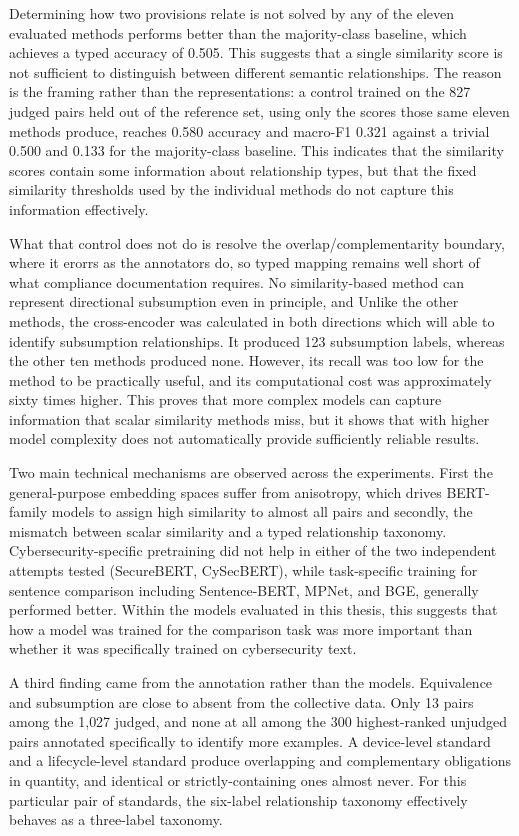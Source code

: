 Determining how two provisions relate is not solved by any of the eleven evaluated methods performs better than the majority-class baseline, which achieves a typed accuracy of 0.505. 
This suggests that a single similarity score is not sufficient to distinguish between different semantic relationships. The reason is the framing rather than the representations: a control trained on the 827 judged pairs held out of the reference set, using only the scores those same eleven methods produce,
reaches 0.580 accuracy and macro-F1 0.321 against a trivial 0.500 and 0.133 for the majority-class baseline. This indicates that the similarity scores contain some information about relationship types, but that the fixed similarity thresholds used by the individual methods do not capture this information effectively.

What that control does not do is resolve the overlap/complementarity boundary,
where it erorrs as the annotators do, so typed mapping remains well short of what
compliance documentation requires. No similarity-based method can represent
directional subsumption even in principle, and Unlike the other methods, the cross-encoder was calculated in both directions which will able to identify subsumption relationships. It produced 123 subsumption labels, whereas the other ten methods produced none. However, its recall was too low for the method to be practically useful, and its computational cost was approximately sixty times higher. This proves that more complex models can capture information that scalar similarity methods miss, but it shows that with higher model complexity does not automatically provide sufficiently reliable results.

Two main technical mechanisms are observed across the experiments. First the
general-purpose embedding spaces suffer from anisotropy, which drives BERT-family models to assign high similarity to almost all pairs and secondly, the mismatch between scalar similarity and a typed relationship taxonomy. Cybersecurity-specific pretraining did not help in either of the two independent attempts tested (SecureBERT, CySecBERT), while task-specific training for sentence comparison including Sentence-BERT, MPNet, and BGE, generally performed better. Within the models evaluated in this thesis, this suggests that how a model was trained for the comparison task was more important than whether it was specifically trained on cybersecurity text.

A third finding came from the annotation rather than the models. Equivalence and
subsumption are close to absent from the collective data. Only 13 pairs among the 1{,}027
judged, and none at all among the 300 highest-ranked unjudged pairs annotated
specifically to identify more examples. A device-level standard and a lifecycle-level standard
produce overlapping and complementary obligations in quantity, and identical or
strictly-containing ones almost never. For this particular pair of standards, the six-label relationship taxonomy effectively behaves as a three-label taxonomy.

